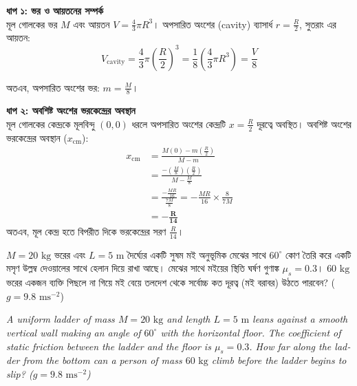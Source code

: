 \documentclass[12pt, a4paper]{article}
\begin{document}
\begin{tcolorbox}[solutionbox={সমাধান (Solution)}]
    \noindent
    \textbf{ধাপ ১: ভর ও আয়তনের সম্পর্ক} \\
    মূল গোলকের ভর $M$ এবং আয়তন $V = \frac{4}{3} \pi R^3$। 
    অপসারিত অংশের (cavity) ব্যাসার্ধ $r = \frac{R}{2}$, সুতরাং এর আয়তন:
    \[ V_{\text{cavity}} = \frac{4}{3} \pi \left(\frac{R}{2}\right)^3 = \frac{1}{8} \left(\frac{4}{3} \pi R^3\right) = \frac{V}{8} \]
    
    অতএব, অপসারিত অংশের ভর: $m = \frac{M}{8}$।
    
    \vspace{0.5em}
    \noindent\textbf{ধাপ ২: অবশিষ্ট অংশের ভরকেন্দ্রের অবস্থান} \\
    মূল গোলকের কেন্দ্রকে মূলবিন্দু $(0,0)$ ধরলে অপসারিত অংশের কেন্দ্রটি $x = \frac{R}{2}$ দূরত্বে অবস্থিত। 
    অবশিষ্ট অংশের ভরকেন্দ্রের অবস্থান ($x_{\text{cm}}$):
    \begin{align*}
        x_{\text{cm}} &= \frac{M(0) - m\left(\frac{R}{2}\right)}{M - m} \\
        &= \frac{-\left(\frac{M}{8}\right)\left(\frac{R}{2}\right)}{M - \frac{M}{8}} \\
        &= \frac{-\frac{M R}{16}}{\frac{7M}{8}} = -\frac{M R}{16} \times \frac{8}{7M} \\
        &= \mathbf{-\frac{R}{14}}
    \end{align*}
    অতএব, মূল কেন্দ্র হতে বিপরীত দিকে ভরকেন্দ্রের সরণ $\frac{R}{14}$।
\end{tcolorbox}

\begin{tcolorbox}[questionbox={প্রশ্ন (Question) 14}]
    \noindent
    $M = 20\text{ kg}$ ভরের এবং $L = 5\text{ m}$ দৈর্ঘ্যের একটি সুষম মই অনুভূমিক মেঝের সাথে $60^\circ$ কোণ তৈরি করে একটি মসৃণ উল্লম্ব দেওয়ালের সাথে হেলান দিয়ে রাখা আছে। মেঝের সাথে মইয়ের স্থিতি ঘর্ষণ গুণাঙ্ক $\mu_s = 0.3$। $60\text{ kg}$ ভরের একজন ব্যক্তি পিছলে না গিয়ে মই বেয়ে তলদেশ থেকে সর্বোচ্চ কত দূরত্ব (মই বরাবর) উঠতে পারবেন? ($g = 9.8\text{ ms}^{-2}$)
    
    \vspace{0.8em}
    \begin{english}
    \noindent\textit{\color{darkgray}
    A uniform ladder of mass $M = 20\text{ kg}$ and length $L = 5\text{ m}$ leans against a smooth vertical wall making an angle of $60^\circ$ with the horizontal floor. The coefficient of static friction between the ladder and the floor is $\mu_s = 0.3$. How far along the ladder from the bottom can a person of mass $60\text{ kg}$ climb before the ladder begins to slip? ($g = 9.8\text{ ms}^{-2}$)
    }
    \end{english}
\end{tcolorbox}
\end{document}
